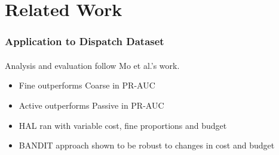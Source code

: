 \documentclass{beamer}
\begin{document}
\section{Related Work}
\begin{frame}
    \frametitle{Application to Dispatch Dataset}
    \framesubtitle{}
    \par Analysis and evaluation follow Mo et al.'s work.
    \begin{itemize}
      \item Fine outperforms Coarse in PR-AUC
      \item Active outperforms Passive in PR-AUC
      \item HAL ran with variable cost, fine proportions and budget
      \item BANDIT approach shown to be robust to changes in cost and budget
    \end{itemize}
\end{frame}
\end{document}
